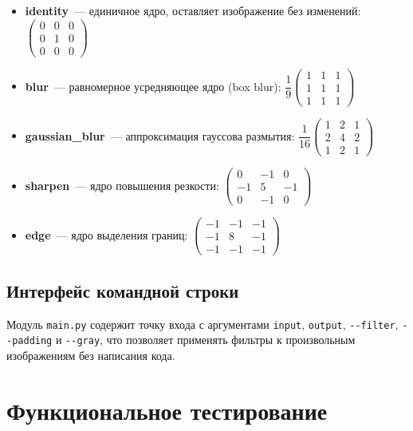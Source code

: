 \documentclass[a4paper]{article}
\begin{document}
\begin{itemize}
    \item \textbf{identity}~--- единичное ядро, оставляет изображение без изменений:
    $\begin{pmatrix}
        0 & 0 & 0 \\
        0 & 1 & 0 \\
        0 & 0 & 0
    \end{pmatrix}$
    \item \textbf{blur}~--- равномерное усредняющее ядро (box blur):
    $\dfrac{1}{9} \begin{pmatrix}
        1 & 1 & 1 \\
        1 & 1 & 1 \\
        1 & 1 & 1
    \end{pmatrix}$
    \item \textbf{gaussian\_blur}~--- аппроксимация гауссова размытия:
    $\dfrac{1}{16} \begin{pmatrix}
        1 & 2 & 1 \\
        2 & 4 & 2 \\
        1 & 2 & 1
    \end{pmatrix}$
    \item \textbf{sharpen}~--- ядро повышения резкости:
    $\begin{pmatrix}
        0 & -1 & 0 \\
        -1 & 5 & -1 \\
        0 & -1 & 0
    \end{pmatrix}$
    \item \textbf{edge}~--- ядро выделения границ:
    $\begin{pmatrix}
        -1 & -1 & -1 \\
        -1 & 8 & -1 \\
        -1 & -1 & -1
    \end{pmatrix}$
\end{itemize}

\subsection{Интерфейс командной строки}

Модуль \verb|main.py| содержит точку входа с аргументами \verb|input|, \verb|output|, \verb|--filter|, \verb|--padding| и \verb|--gray|, что позволяет применять фильтры к произвольным изображениям без написания кода.

\section{Функциональное тестирование}
\end{document}
